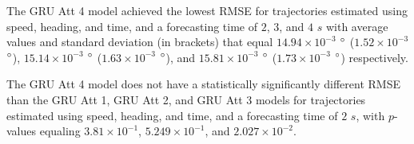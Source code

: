 \documentclass[preprint,12pt]{elsarticle}
\begin{document}
\begin{table}[!ht]
	\centering
	\caption{The average RMSE in $\degree$ ($\times 10^{-2}$), with standard deviation in brackets, across $k$-fold validation datasets for the trajectories in the $k$-fold testing datasets estimated using speed, heading, and time, different RNN models, and forecasting times.}
	\label{tab:best_speed_actual_dir_RMSE}
\end{table}

The GRU Att 4 model achieved the lowest RMSE for trajectories estimated using speed, heading, and time, and a forecasting time of $2$, $3$, and $4$ $s$ with average values and standard deviation (in brackets) that equal $14.94 \times 10^{-3}$ $\degree$ ($1.52 \times 10^{-3}$ $\degree$), $15.14 \times 10^{-3}$ $\degree$ ($1.63 \times 10^{-3}$ $\degree$), and $15.81 \times 10^{-3}$ $\degree$ ($1.73 \times 10^{-3}$ $\degree$) respectively.

The GRU Att 4 model does not have a statistically significantly different RMSE than the GRU Att 1, GRU Att 2, and GRU Att 3 models for trajectories estimated using speed, heading, and time, and a forecasting time of $2$ $s$, with $p$-values equaling $3.81 \times 10^{-1}$, $5.249 \times 10^{-1}$, and $2.027 \times 10^{-2}$.
\end{document}
